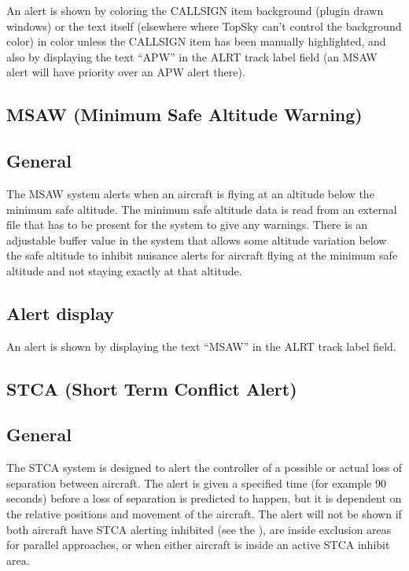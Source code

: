 \documentclass[11pt,a4paper]{memoir}
\newcommand{\colorref}[1]{\textit{\hyperref[#1]{\StrDel{#1}{color:}}}}
\begin{document}
An alert is shown by coloring the CALLSIGN item background (plugin drawn windows) or the text itself (elsewhere where TopSky can’t control the background color) in \colorref{color:Warning} color unless the CALLSIGN item has been manually highlighted, and also by displaying the text “APW” in the ALRT track label field (an MSAW alert will have priority over an APW alert there).

\subsection{MSAW (Minimum Safe Altitude Warning)}

\subsection*{General}

The MSAW system alerts when an aircraft is flying at an altitude below the minimum safe altitude. The minimum safe altitude data is read from an external file that has to be present for the system to give any warnings. There is an adjustable buffer value in the system that allows some altitude variation below the safe altitude to inhibit nuisance alerts for aircraft flying at the minimum safe altitude and not staying exactly at that altitude.

\subsection*{Alert display}

An alert is shown by displaying the text “MSAW” in the ALRT track label field.

\subsection{STCA (Short Term Conflict Alert)}

\subsection*{General}

The STCA system is designed to alert the controller of a possible or actual loss of separation between aircraft. The alert is given a specified time (for example 90 seconds) before a loss of separation is predicted to happen, but it is dependent on the relative positions and movement of the aircraft. The alert will not be shown if both aircraft have STCA alerting inhibited (see the \textit{}), are inside exclusion areas for parallel approaches, or when either aircraft is inside an active STCA inhibit area.
\end{document}
